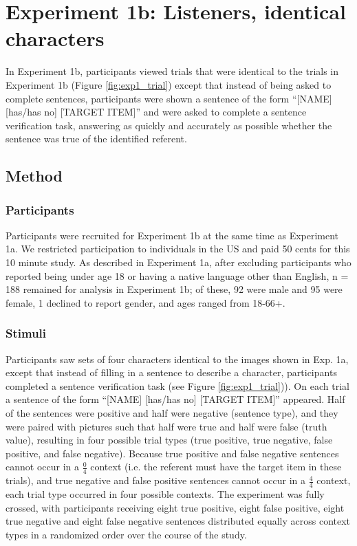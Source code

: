 \documentclass[man, floatsintext, noapacite]{apa6}
\begin{document}
\section{Experiment 1b: Listeners, identical characters}

In Experiment 1b, participants viewed trials that were identical to the trials in Experiment 1b (Figure \ref{fig:exp1_trial}) except that instead of being asked to complete sentences, participants were shown a sentence of the form ``[NAME] [has/has no] [TARGET ITEM]'' and were asked to complete a sentence verification task, answering as quickly and accurately as possible whether the sentence was true of the identified referent. 

\subsection{Method}

\subsubsection{Participants} 

Participants were recruited for Experiment 1b at the same time as Experiment 1a. We restricted participation to individuals in the US and paid 50 cents for this 10 minute study. As described in Experiment 1a, after excluding participants who reported being under age 18 or having a native language other than English, n = 188 remained for analysis in Experiment 1b; of these, 92 were male and 95 were female, 1 declined to report gender, and ages ranged from 18-66+.

\subsubsection{Stimuli}

Participants saw sets of four characters identical to the images shown in Exp. 1a, except that instead of filling in a sentence to describe a character, participants completed a sentence verification task (see Figure \ref{fig:exp1_trial})). On each trial a sentence of the form ``[NAME] [has/has no] [TARGET ITEM]'' appeared.  Half of the sentences were positive and half were negative (sentence type), and they were paired with pictures such that half were true and half were false (truth value), resulting in four possible trial types (true positive, true negative, false positive, and false negative).  Because true positive and false negative sentences cannot occur in a $\frac{0}{4}$ context (i.e. the referent must have the target item in these trials), and true negative and false positive sentences cannot occur in a $\frac{4}{4}$ context, each trial type occurred in four possible contexts.  The experiment was fully crossed, with participants receiving eight true positive, eight false positive, eight true negative and eight false negative sentences distributed equally across context types in a randomized order over the course of the study.  
\end{document}
